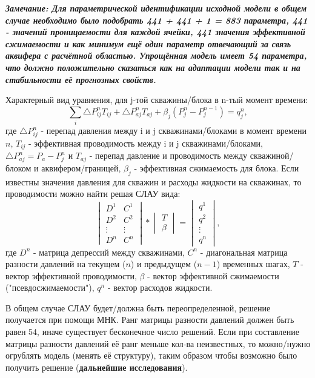 \documentclass[14pt]{article}
\begin{document}
	\textbf{\textit{Замечание: Для параметрической идентификации исходной модели в общем случае необходимо было подобрать 441 + 441 + 1 = 883 параметра, 441 - значений проницаемости для каждой ячейки, 441 значения эффективной сжимаемости и как минимум ещё один параметр отвечающий за связь аквифера с расчётной областью. Упрощённая модель имеет 54 параметра, что должно положительно сказаться как на адаптации модели так и на стабильности её прогнозных свойств.}}
	     
	Характерный вид уравнения, для j-той скважины/блока в n-тый момент времени:
	\begin{equation} \label{eq1}
		\sum_{i}{ \triangle P_{ij}^n T_{ij}} + \triangle P_{aj}^n T_{aj} + \beta_j (P_j^n - P_j^{n-1}) = q_{j}^n,
	\end{equation}
	где $\triangle P_{ij}^n$ - перепад давления между i и j скважинами/блоками в момент времени $n$, $T_{ij}$ - эффективная проводимость между i и j скважинами/блоками, $\triangle P_{aj}^n = P_a - P_j^n$ и $T_{aj}$ - перепад давление и проводимость между скважиной/блоком и аквифером/границей, $\beta_j$ - эффективная сжимаемость для блока. 
	Если известны значения давления для скважин и расходы жидкости на скважинах, то проводимости можно найти решая СЛАУ вида:
	\begin{equation} \label{m3x1}
		\begin{vmatrix}
			D^1& C^1\\
			D^2& C^2 \\
			\vdots&\vdots\\
			D^n& C^n
		\end{vmatrix}
		* 
		\begin{vmatrix}
			T\\
			\beta
		\end{vmatrix}
		=
		\begin{vmatrix}
			q^1\\
			q^2\\
			\vdots\\
			q^n
		\end{vmatrix},
	\end{equation}
	где $D^n$ - матрица депрессий между скважинами, $C^n$ - диагональная матрица разности давлений на текущем ($n$) и предыдущем ($n-1$) временных шагах, $T$ - вектор эффективной проводимости, $\beta$ - вектор эффективной сжимаемости ("псевдосжимаемости"), $q^n$ - вектор расходов жидкости.
	
	
	В общем случае СЛАУ будет/должна быть переопределенной, решение получается при помощи МНК. Ранг матрицы разности давлений должен быть равен 54, иначе существует бесконечное число решений. Если при составление матрицы разности давлений её ранг меньше кол-ва неизвестных, то  можно/нужно огрублять модель (менять её структуру), таким образом чтобы возможно было получить решение (\textbf{дальнейшие исследования}). 
	
\end{document}
